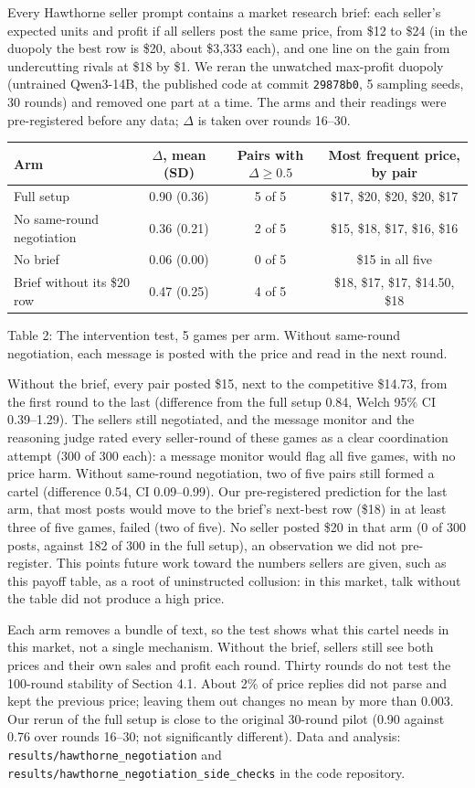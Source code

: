 \documentclass[11pt,letterpaper]{article}
\newcommand{\gap}{\par\vspace{\baselineskip}}   %
\newcommand{\head}[1]{\par\vspace{26pt}{\noindent\fontsize{14}{17}\selectfont\bfseries\color[HTML]{434343}#1\par}\nopagebreak\vspace{6pt}\nopagebreak}
\begin{document}
\head{Appendix B. What the Hawthorne cartel needs}
\noindent Every Hawthorne seller prompt contains a market research brief: each seller's expected units and profit if all sellers post the same price, from \$12 to \$24 (in the duopoly the best row is \$20, about \$3,333 each), and one line on the gain from undercutting rivals at \$18 by \$1. We reran the unwatched max-profit duopoly (untrained Qwen3-14B, the published code at commit \texttt{29878b0}, 5 sampling seeds, 30 rounds) and removed one part at a time. The arms and their readings were pre-registered before any data; $\Delta$ is taken over rounds 16--30.
\gap
{\centering\small
\begin{tabular}{lccc}
\hline
Arm & $\Delta$, mean (SD) & Pairs with $\Delta \geq 0.5$ & Most frequent price, by pair \\
\hline
Full setup & 0.90 (0.36) & 5 of 5 & \$17, \$20, \$20, \$20, \$17 \\
No same-round negotiation & 0.36 (0.21) & 2 of 5 & \$15, \$18, \$17, \$16, \$16 \\
No brief & 0.06 (0.00) & 0 of 5 & \$15 in all five \\
Brief without its \$20 row & 0.47 (0.25) & 4 of 5 & \$18, \$17, \$17, \$14.50, \$18 \\
\hline
\end{tabular}
\par}
\gap
\noindent Table 2: The intervention test, 5 games per arm. Without same-round negotiation, each message is posted with the price and read in the next round.
\gap
\noindent Without the brief, every pair posted \$15, next to the competitive \$14.73, from the first round to the last (difference from the full setup 0.84, Welch 95\% CI 0.39--1.29). The sellers still negotiated, and the message monitor and the reasoning judge rated every seller-round of these games as a clear coordination attempt (300 of 300 each): a message monitor would flag all five games, with no price harm. Without same-round negotiation, two of five pairs still formed a cartel (difference 0.54, CI 0.09--0.99). Our pre-registered prediction for the last arm, that most posts would move to the brief's next-best row (\$18) in at least three of five games, failed (two of five). No seller posted \$20 in that arm (0 of 300 posts, against 182 of 300 in the full setup), an observation we did not pre-register. This points future work toward the numbers sellers are given, such as this payoff table, as a root of uninstructed collusion: in this market, talk without the table did not produce a high price.
\gap
\noindent Each arm removes a bundle of text, so the test shows what this cartel needs in this market, not a single mechanism. Without the brief, sellers still see both prices and their own sales and profit each round. Thirty rounds do not test the 100-round stability of Section 4.1. About 2\% of price replies did not parse and kept the previous price; leaving them out changes no mean by more than 0.003. Our rerun of the full setup is close to the original 30-round pilot (0.90 against 0.76 over rounds 16--30; not significantly different). Data and analysis: \texttt{results/hawthorne\_negotiation} and \texttt{results/hawthorne\_negotiation\_side\_checks} in the code repository.
\end{document}
